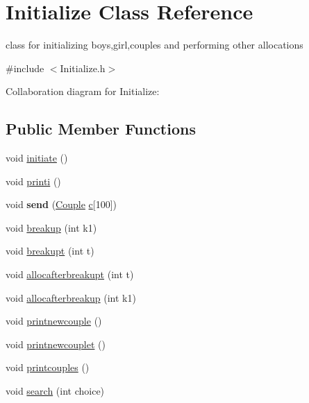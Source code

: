\hypertarget{classInitialize}{}\section{Initialize Class Reference}
\label{classInitialize}


class for initializing boys,girl,couples and performing other allocations  




{\ttfamily \#include $<$Initialize.\+h$>$}



Collaboration diagram for Initialize\+:
\subsection*{Public Member Functions}
\begin{DoxyCompactItemize}
\item 
void \hyperlink{classInitialize_a8c12583578090e6fdceaae8d1ecf935c}{initiate} ()
\item 
void \hyperlink{classInitialize_aa44b56ebd2fbaa05309ad54ff1b9ca35}{printi} ()
\item 
void {\bfseries send} (\hyperlink{classCouple}{Couple} \hyperlink{classInitialize_aaf5cb4df24e3003d80466a8f1efe2304}{c}\mbox{[}100\mbox{]})\hypertarget{classInitialize_a8467bd1dee69ac035cb3be0922fb9e47}{}\label{classInitialize_a8467bd1dee69ac035cb3be0922fb9e47}

\item 
void \hyperlink{classInitialize_a70ae68decc2d26414038c19ed68ab801}{breakup} (int k1)
\item 
void \hyperlink{classInitialize_aa97bf10d467fe6ff5aacc62d728722ec}{breakupt} (int t)
\item 
void \hyperlink{classInitialize_a3690dc29707cd3493c3d02429e9b9f45}{allocafterbreakupt} (int t)
\item 
void \hyperlink{classInitialize_aeeb102966fe8b7c784189e87c05e499f}{allocafterbreakup} (int k1)
\item 
void \hyperlink{classInitialize_accd567a99e3ac2b783fad620a6368858}{printnewcouple} ()
\item 
void \hyperlink{classInitialize_a4bb31beaaa659887a71e6344a41633ba}{printnewcouplet} ()
\item 
void \hyperlink{classInitialize_abb2917f567947c04ab0b4f8191856176}{printcouples} ()
\item 
void \hyperlink{classInitialize_a7b742a3572d5efa939c8e5701ca326fa}{search} (int choice)
\end{DoxyCompactItemize}
